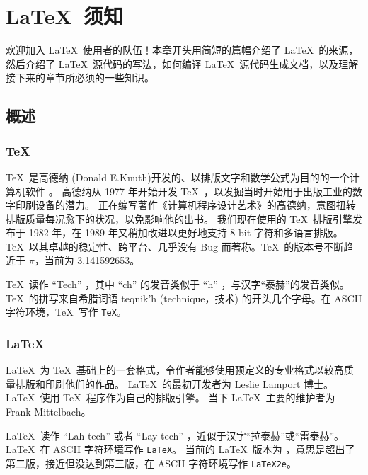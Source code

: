 \chapter{\LaTeX\ 须知}\label{chap:basics}

\begin{intro}
欢迎加入 \LaTeX\ 使用者的队伍！本章开头用简短的篇幅介绍了 \LaTeX\ 的来源，
然后介绍了 \LaTeX\ 源代码的写法，如何编译 \LaTeX\ 源代码生成文档，以及理解接下来的章节所必须的一些知识。
\end{intro}

\section{概述}\label{sec:intro}

\subsection{\protect\TeX}\label{subsec:tex}

\TeX\ 是高德纳 (Donald E.Knuth)开发的、以排版文字和数学公式为目的的一个计算机软件 \cite{texbook}。
高德纳从 1977 年开始开发 \TeX\ ，以发掘当时开始用于出版工业的数字印刷设备的潜力。
正在编写著作《计算机程序设计艺术》的高德纳，意图扭转排版质量每况愈下的状况，以免影响他的出书。
我们现在使用的 \TeX\ 排版引擎发布于 1982 年，在 1989 年又稍加改进以更好地支持 8-bit 字符和多语言排版。
\TeX\ 以其卓越的稳定性、跨平台、几乎没有 Bug 而著称。\TeX\ 的版本号不断趋近于 $\pi$，当前为 3.141592653。

\TeX\ 读作 ``Tech'' ，其中 ``ch'' 的发音类似于 ``h'' ，与汉字“泰赫”的发音类似。\TeX\ 的拼写来自希腊词语
{\selectfont teqnik'h} (technique，技术) 的开头几个字母。在 ASCII 字符环境，\TeX\ 写作 \texttt{TeX}。

\subsection{\LaTeX}\label{subsec:latex}

\LaTeX\ 为 \TeX\ 基础上的一套格式，令作者能够使用预定义的专业格式以较高质量排版和印刷他们的作品。
\LaTeX\ 的最初开发者为 Leslie Lamport 博士\cite{manual}。\LaTeX\ 使用 \TeX\ 程序作为自己的排版引擎。
当下 \LaTeX\ 主要的维护者为 Frank Mittelbach。

\LaTeX\ 读作 ``Lah-tech'' 或者 ``Lay-tech'' ，近似于汉字“拉泰赫”或“雷泰赫”。\LaTeX\ 在 ASCII 字符环境写作 \texttt{LaTeX}。
当前的 \LaTeX\ 版本为 \LaTeXe ，意思是超出了第二版，接近但没达到第三版，在 ASCII 字符环境写作 \texttt{LaTeX2e}。

